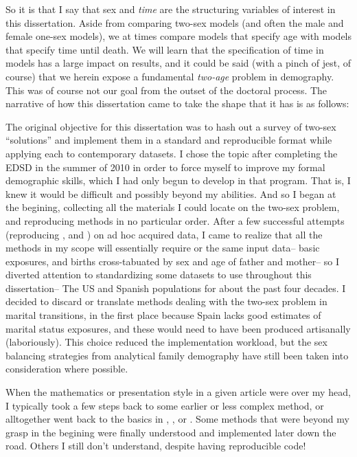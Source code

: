 So it is that I say that sex and \textit{time} are the structuring variables of
interest in this dissertation. Aside from comparing two-sex models (and often the male
and female one-sex models), we at times compare models that
specify age with models that specify time until death. We will learn that the
specification of time in models has a large impact on results, and it could
be said (with a pinch of jest, of course) that we herein expose a
fundamental \textit{two-age} problem in demography. This was of course not our goal from the
outset of the doctoral process. The narrative of how this dissertation came to
take the shape that it has is as follows:

The original objective for this dissertation was to hash out a survey of two-sex
``solutions'' and implement them in a standard and reproducible format while
applying each to contemporary datasets. I chose the topic after completing the
EDSD in the summer of 2010 in order to force myself to improve my formal
demographic skills, which I had only begun to develop in that program. That
is, I knew it would be difficult and possibly beyond my abilities. And so I
began at the begining, collecting all the materials I could locate on the 
two-sex problem, and reproducing methods in no particular order. After a few 
successful attempts (reproducing \citet{schoen1981harmonic},
\citet{mc1975models} and \citet{henry1972nuptiality}) on ad hoc acquired data, I
came to realize that all the methods in my scope will essentially require or
the same input data-- basic exposures, and births cross-tabuated by
sex and age of father and mother-- so I diverted attention to standardizing some
datasets to use throughout this dissertation-- The US and Spanish populations
for about the past four decades. I decided to discard or translate methods
dealing with the two-sex problem in marital transitions, in the first place 
because Spain lacks good estimates of marital status exposures, 
and these would need to have been produced artisanally (laboriously). This
choice reduced the implementation workload, but the sex balancing strategies
from analytical family demography have still been taken into consideration where
possible.

When the mathematics or
presentation style in a given article were over my head, I typically took a few
steps back to some earlier or less complex method, or alltogether went back to the basics 
in \citet{sharpe1911problem}, \citet{kuczynski1932fertility}, \citet{coale1972growth} 
or \citet{caswell2001matrix}. Some methods that were beyond my grasp in the 
begining \citep[e.g.][]{mitra1978derivation, gupta1978alternative} were finally
understood and implemented later down the road. Others I still don't understand\cite[e.g.][]{choo2006estimating}, despite having
reproducible code!

